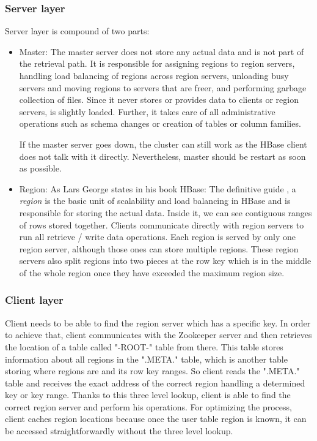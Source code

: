 \subsubsection{Server layer}
Server layer is compound of two parts:
\begin{itemize}
\item Master: The master server does not store any actual data and is not part of the retrieval path. It is responsible for assigning regions to region servers, handling load balancing of regions across region servers, unloading busy servers and moving regions to servers that are freer, and performing garbage collection of files. Since it never stores or provides data to clients or region servers, is slightly loaded. Further, it takes care of all administrative operations such as schema changes or creation of tables or column families.
\par
If the master server goes down, the cluster can still work as the HBase client does not talk with it directly. Nevertheless, master should be restart as soon as possible.
\item Region: As Lars George states in his book HBase: The definitive guide \cite{george2011hbase}, a \textit{region} is the basic unit of scalability and load balancing in HBase and is responsible for storing the actual data. Inside it, we can see contiguous ranges of rows stored together. Clients communicate directly with region servers to run all retrieve / write data operations. Each region is served by only one region server, although those ones can store multiple regions. These region servers also split regions into two pieces at the row key which is in the middle of the whole region once they have exceeded the maximum region size.
\end{itemize}

\subsubsection{Client layer}

Client needs to be able to find the region server which has a specific key. In order to achieve that, client communicates with the Zookeeper server and then retrieves the location of a table called "-ROOT-" table from there. This table stores information about all regions in the ".META." table, which is another table storing where regions are and its row key ranges. So client reads the ".META." table and receives the exact address of the correct region handling a determined key or key range. Thanks to this three level lookup, client is able to find the correct region server and perform his operations. For optimizing the process, client caches region locations because once the user table region is known, it can be accessed straightforwardly without the three level lookup.


